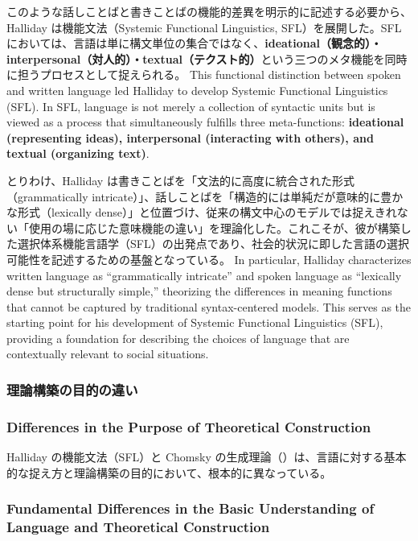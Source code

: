 \ifJPN
このような話しことばと書きことばの機能的差異を明示的に記述する必要から、Halliday は機能文法（Systemic Functional Linguistics, SFL）を展開した。SFL においては、言語は単に構文単位の集合ではなく、\textbf{ideational（観念的）・interpersonal（対人的）・textual（テクスト的）}という三つのメタ機能を同時に担うプロセスとして捉えられる。
\else
  This functional distinction between spoken and written language led Halliday to develop Systemic Functional Linguistics (SFL). In SFL, language is not merely a collection of syntactic units but is viewed as a process that simultaneously fulfills three meta-functions: \textbf{ideational (representing ideas), interpersonal (interacting with others), and textual (organizing text)}.
\fi

\ifJPN
とりわけ、Halliday は書きことばを「文法的に高度に統合された形式（grammatically intricate）」、話しことばを「構造的には単純だが意味的に豊かな形式（lexically dense）」と位置づけ、従来の構文中心のモデルでは捉えきれない「使用の場に応じた意味機能の違い」を理論化した。これこそが、彼が構築した選択体系機能言語学（SFL）の出発点であり、社会的状況に即した言語の選択可能性を記述するための基盤となっている。
\else
In particular, Halliday characterizes written language as ``grammatically intricate'' and spoken language as ``lexically dense but structurally simple,'' theorizing the differences in meaning functions that cannot be captured by traditional syntax-centered models. This serves as the starting point for his development of Systemic Functional Linguistics (SFL), providing a foundation for describing the choices of language that are contextually relevant to social situations.
\fi

\if
\subsubsection{理論構築の目的の違い}
\else
\subsubsection{Differences in the Purpose of Theoretical Construction}
\fi

\ifJPN
Halliday の機能文法（SFL）と Chomsky の生成理論（\textcite{chomsky1965aspects}）は、言語に対する基本的な捉え方と理論構築の目的において、根本的に異なっている。
\else
  \subsubsection{Fundamental Differences in the Basic Understanding of Language and Theoretical Construction}
\fi

